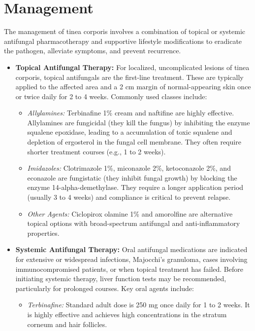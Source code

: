 \section*{Management}
The management of tinea corporis involves a combination of topical or systemic antifungal pharmacotherapy and supportive lifestyle modifications to eradicate the pathogen, alleviate symptoms, and prevent recurrence.

\begin{itemize}
    \item \textbf{Topical Antifungal Therapy:} For localized, uncomplicated lesions of tinea corporis, topical antifungals are the first-line treatment. These are typically applied to the affected area and a 2 cm margin of normal-appearing skin once or twice daily for 2 to 4 weeks. Commonly used classes include:
    \begin{itemize}
        \item \textit{Allylamines:} Terbinafine 1\% cream and naftifine are highly effective. Allylamines are fungicidal (they kill the fungus) by inhibiting the enzyme squalene epoxidase, leading to a accumulation of toxic squalene and depletion of ergosterol in the fungal cell membrane. They often require shorter treatment courses (e.g., 1 to 2 weeks).
        \item \textit{Imidazoles:} Clotrimazole 1\%, miconazole 2\%, ketoconazole 2\%, and econazole are fungistatic (they inhibit fungal growth) by blocking the enzyme 14-alpha-demethylase. They require a longer application period (usually 3 to 4 weeks) and compliance is critical to prevent relapse.
        \item \textit{Other Agents:} Ciclopirox olamine 1\% and amorolfine are alternative topical options with broad-spectrum antifungal and anti-inflammatory properties.
    \end{itemize}
    \item \textbf{Systemic Antifungal Therapy:} Oral antifungal medications are indicated for extensive or widespread infections, Majocchi's granuloma, cases involving immunocompromised patients, or when topical treatment has failed. Before initiating systemic therapy, liver function tests may be recommended, particularly for prolonged courses. Key oral agents include:
    \begin{itemize}
        \item \textit{Terbinafine:} Standard adult dose is 250 mg once daily for 1 to 2 weeks. It is highly effective and achieves high concentrations in the stratum corneum and hair follicles.

\end{itemize}
\end{itemize}
